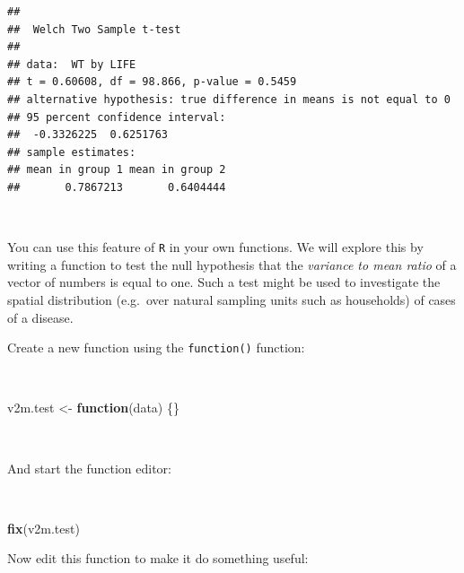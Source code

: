 \documentclass[12pt,a4paper]{book}
\newenvironment{Shaded}{\begin{snugshade}}{\end{snugshade}}
\newcommand{\KeywordTok}[1]{\textcolor[rgb]{0.13,0.29,0.53}{\textbf{#1}}}
\newcommand{\StringTok}[1]{\textcolor[rgb]{0.31,0.60,0.02}{#1}}
\newcommand{\ControlFlowTok}[1]{\textcolor[rgb]{0.13,0.29,0.53}{\textbf{#1}}}
\newcommand{\NormalTok}[1]{#1}
\theoremstyle{definition}
\theoremstyle{definition}
\theoremstyle{definition}
\theoremstyle{remark}
\begin{document}
\begin{verbatim}
## 
##  Welch Two Sample t-test
## 
## data:  WT by LIFE
## t = 0.60608, df = 98.866, p-value = 0.5459
## alternative hypothesis: true difference in means is not equal to 0
## 95 percent confidence interval:
##  -0.3326225  0.6251763
## sample estimates:
## mean in group 1 mean in group 2 
##       0.7867213       0.6404444
\end{verbatim}

~

You can use this feature of \texttt{R} in your own functions. We will
explore this by writing a function to test the null hypothesis that the
\emph{variance to mean ratio} of a vector of numbers is equal to one.
Such a test might be used to investigate the spatial distribution
(e.g.~over natural sampling units such as households) of cases of a
disease.

Create a new function using the \texttt{function()} function:

~

\begin{Shaded}
\begin{Highlighting}[]
\NormalTok{v2m.test <-}\StringTok{ }\ControlFlowTok{function}\NormalTok{(data) \{\}}
\end{Highlighting}
\end{Shaded}

~

And start the function editor:

~

\begin{Shaded}
\begin{Highlighting}[]
\KeywordTok{fix}\NormalTok{(v2m.test)}
\end{Highlighting}
\end{Shaded}

\newpage

Now edit this function to make it do something useful:

~
\end{document}
